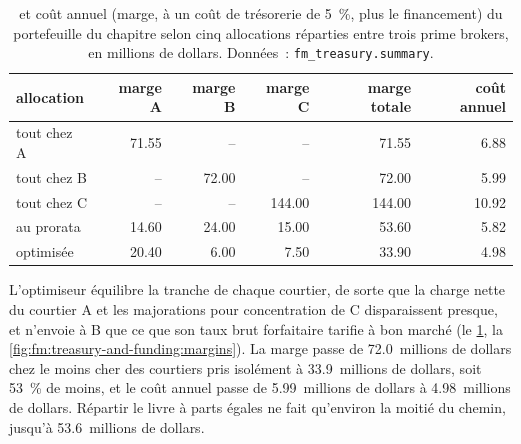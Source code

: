 \begin{table}[ht]
\centering\small
\begin{tabular}{lrrrrr}
\toprule
allocation & marge A & marge B & marge C & marge totale & coût annuel \\
\midrule
tout chez A & 71.55 & -- & -- & 71.55 & 6.88 \\
tout chez B & -- & 72.00 & -- & 72.00 & 5.99 \\
tout chez C & -- & -- & 144.00 & 144.00 & 10.92 \\
au prorata & 14.60 & 24.00 & 15.00 & 53.60 & 5.82 \\
optimisée & 20.40 & 6.00 & 7.50 & 33.90 & 4.98 \\
\bottomrule
\end{tabular}
\caption{ et coût annuel (marge, à un coût de trésorerie de 5~\%, plus le financement) du portefeuille du chapitre selon cinq allocations réparties entre trois
prime brokers, en millions de dollars. Données~: \texttt{fm\_treasury.summary}.}\label{tab:fm:treasury-and-funding:alloc}
\end{table}

L'optimiseur équilibre la tranche de chaque courtier, de sorte que la charge nette du courtier A et les majorations pour concentration de C disparaissent presque, et n'envoie à B que
ce que son taux brut forfaitaire tarifie à bon marché (le \cref{tab:fm:treasury-and-funding:alloc}, la \cref{fig:fm:treasury-and-funding:margins}). La marge passe de 72.0~millions de dollars
chez le moins cher des courtiers pris isolément à 33.9~millions de dollars, soit 53~\% de moins, et le coût annuel passe de 5.99~millions de dollars à 4.98~millions de dollars. Répartir le livre
à parts égales ne fait qu'environ la moitié du chemin, jusqu'à 53.6~millions de dollars.

